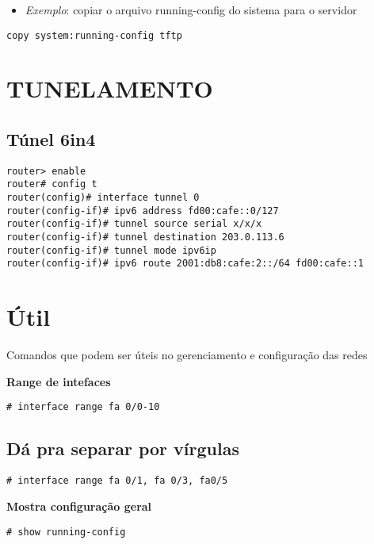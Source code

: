 \documentclass[]{article}
\begin{document}
\begin{itemize}
\itemsep1pt\parskip0pt
\item
  \emph{Exemplo}: copiar o arquivo running-config do sistema para o
  servidor
\end{itemize}

\begin{verbatim}
copy system:running-config tftp
\end{verbatim}

\section{TUNELAMENTO}\label{tunelamento}

\subsection{Túnel 6in4}\label{tuxfanel-6in4}

\begin{verbatim}
router> enable
router# config t
router(config)# interface tunnel 0
router(config-if)# ipv6 address fd00:cafe::0/127
router(config-if)# tunnel source serial x/x/x
router(config-if)# tunnel destination 203.0.113.6
router(config-if)# tunnel mode ipv6ip
router(config-if)# ipv6 route 2001:db8:cafe:2::/64 fd00:cafe::1
\end{verbatim}

\section{Útil}\label{uxfatil}

Comandos que podem ser úteis no gerenciamento e configuração das redes

\textbf{Range de intefaces}

\begin{verbatim}
# interface range fa 0/0-10
\end{verbatim}

\subsection{Dá pra separar por
vírgulas}\label{duxe1-pra-separar-por-vuxedrgulas}

\begin{verbatim}
# interface range fa 0/1, fa 0/3, fa0/5
\end{verbatim}

\textbf{Mostra configuração geral}

\begin{verbatim}
# show running-config
\end{verbatim}
\end{document}
